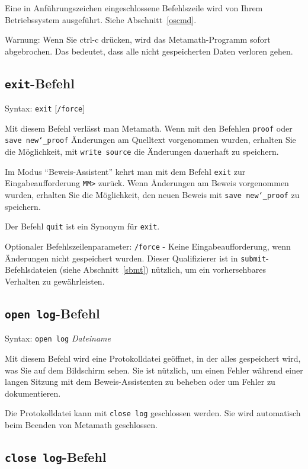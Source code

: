 Eine in Anführungszeichen eingeschlossene Befehlszeile wird von Ihrem Betriebssystem ausgeführt. Siehe Abschnitt~\ref{oscmd}. 

{Warnung:} Wenn Sie {\sc ctrl-c} drücken, wird das Metamath-Programm sofort abgebrochen.  Das bedeutet, dass alle nicht gespeicherten Daten verloren gehen. 


\subsection{\texttt{exit}-Befehl}

Syntax:  \texttt{exit} [\texttt{/force}]

Mit diesem Befehl verlässt man Metamath.  Wenn mit den Befehlen \texttt{proof} oder \texttt{save new{\char`\_}proof} Änderungen am Quelltext vorgenommen wurden, erhalten Sie die Möglichkeit, mit \texttt{write source} die Änderungen dauerhaft zu speichern. 

Im Modus "`Beweis-Assistent"' kehrt man mit dem Befehl \texttt{exit} zur Eingabeaufforderung \verb/MM>/ zurück. Wenn Änderungen am Beweis vorgenommen wurden, erhalten Sie die Möglichkeit, den neuen Beweis mit \texttt{save new{\char`\_}proof} zu speichern. 

Der Befehl \texttt{quit} ist ein Synonym für \texttt{exit}.

Optionaler Befehlszeilenparameter:
\texttt{/force} - Keine Eingabeaufforderung, wenn Änderungen nicht gespeichert wurden.  Dieser Qualifizierer ist in \texttt{submit}-Befehlsdateien (siehe Abschnitt~\ref{sbmt}) nützlich, um ein vorhersehbares Verhalten zu gewährleisten. 


\subsection{\texttt{open log}-Befehl}

Syntax:  \texttt{open log} {\em Dateiname}

Mit diesem Befehl wird eine Protokolldatei geöffnet, in der alles gespeichert wird, was Sie auf dem Bildschirm sehen.  Sie ist nützlich, um einen Fehler während einer langen Sitzung mit dem Beweis-Assistenten zu beheben oder um Fehler zu dokumentieren. 

Die Protokolldatei kann mit \texttt{close log} geschlossen werden.  Sie wird automatisch beim Beenden von Metamath geschlossen. 


\subsection{\texttt{close log}-Befehl}

